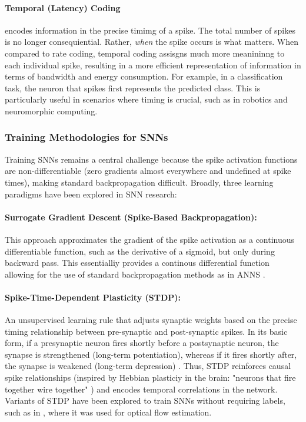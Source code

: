 \documentclass{article}
\begin{document}
\paragraph{Temporal (Latency) Coding} encodes information in the precise timimg of a spike. The total number of spikes is no longer consequiential. Rather, \textit{when} the spike occurs is what matters. When compared to rate coding, temporal coding assisgns much more meanininng to each individual spike, resulting in a more efficient representation of information in terms of bandwidth and energy consumption. For example, in a classification task, the neuron that spikes first represents the predicted class. This is particularly useful in scenarios where timing is crucial, such as in robotics and neuromorphic computing.

\subsubsection {Training Methodologies for SNNs}
Training SNNs remains a central challenge because the spike activation functions are non-differentiable (zero gradients almost everywhere and undefined at spike times), making standard backpropagation difficult. Broadly, three learning paradigms have been explored in SNN research:

\paragraph{Surrogate Gradient Descent (Spike-Based Backpropagation):} This approach approximates the gradient of the spike activation as a continuous differentiable function, such as the derivative of a sigmoid, but only during backward pass. This essentialliy provides a continous differential function allowing for the use of standard backpropagation methods as in ANNS \cite{yamazakiSpikingNeuralNetworks2022, eshraghianTrainingSpikingNeural2023}.

\paragraph{Spike-Time-Dependent Plasticity (STDP):} An unsupervised learning rule that adjusts synaptic weights based on the precise timing relationship between pre-synaptic and post-synaptic spikes. In its basic form, if a presynaptic neuron fires shortly before a postsynaptic neuron, the synapse is strengthened (long-term potentiation), whereas if it fires shortly after, the synapse is weakened (long-term depression) \cite{yamazakiSpikingNeuralNetworks2022}. Thus, STDP reinforces causal spike relationships (inspired by Hebbian plasticiy in the brain: "neurons that fire together wire together" \cite{hebb_organization_1949}) and encodes temporal correlations in the network. Variants of STDP have been explored to train SNNs without requiring labels, such as in \cite{paredes-vallesUnsupervisedLearningHierarchical2020}, where it was used for optical flow estimation.
\end{document}

